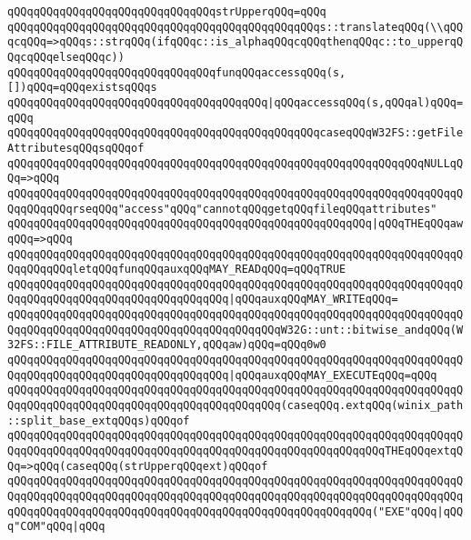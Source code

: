 \verb|qQQqqQQqqQQqqQQqqQQqqQQqqQQqqQQqstrUpperqQQq=qQQq|\newline
\verb|qQQqqQQqqQQqqQQqqQQqqQQqqQQqqQQqqQQqqQQqqQQqqQQqs::translateqQQq(\\qQQqcqQQq=>qQQqs::strqQQq(ifqQQqc::is_alphaqQQqcqQQqthenqQQqc::to_upperqQQqcqQQqelseqQQqc))|\newline
\newline
\verb|qQQqqQQqqQQqqQQqqQQqqQQqqQQqqQQqfunqQQqaccessqQQq(s,[])qQQq=qQQqexistsqQQqs|\newline
\verb|qQQqqQQqqQQqqQQqqQQqqQQqqQQqqQQqqQQqqQQq|\verb#|qQQqaccessqQQq(s,qQQqal)qQQq=qQQq#\newline
\verb|qQQqqQQqqQQqqQQqqQQqqQQqqQQqqQQqqQQqqQQqqQQqqQQqcaseqQQqW32FS::getFileAttributesqQQqsqQQqof|\newline
\verb|qQQqqQQqqQQqqQQqqQQqqQQqqQQqqQQqqQQqqQQqqQQqqQQqqQQqqQQqqQQqqQQqNULLqQQq=>qQQq|\newline
\verb|qQQqqQQqqQQqqQQqqQQqqQQqqQQqqQQqqQQqqQQqqQQqqQQqqQQqqQQqqQQqqQQqqQQqqQQqqQQqqQQqrseqQQq"access"qQQq"cannotqQQqgetqQQqfileqQQqattributes"|\newline
\verb|qQQqqQQqqQQqqQQqqQQqqQQqqQQqqQQqqQQqqQQqqQQqqQQqqQQqqQQq|\verb#|qQQqTHEqQQqawqQQq=>qQQq#\newline
\verb|qQQqqQQqqQQqqQQqqQQqqQQqqQQqqQQqqQQqqQQqqQQqqQQqqQQqqQQqqQQqqQQqqQQqqQQqqQQqqQQqletqQQqfunqQQqauxqQQqMAY_READqQQq=qQQqTRUE|\newline
\verb|qQQqqQQqqQQqqQQqqQQqqQQqqQQqqQQqqQQqqQQqqQQqqQQqqQQqqQQqqQQqqQQqqQQqqQQqqQQqqQQqqQQqqQQqqQQqqQQqqQQqqQQq|\verb#|qQQqauxqQQqMAY_WRITEqQQq=#\newline
\verb|qQQqqQQqqQQqqQQqqQQqqQQqqQQqqQQqqQQqqQQqqQQqqQQqqQQqqQQqqQQqqQQqqQQqqQQqqQQqqQQqqQQqqQQqqQQqqQQqqQQqqQQqqQQqqQQqW32G::unt::bitwise_andqQQq(W32FS::FILE_ATTRIBUTE_READONLY,qQQqaw)qQQq=qQQq0w0|\newline
\verb|qQQqqQQqqQQqqQQqqQQqqQQqqQQqqQQqqQQqqQQqqQQqqQQqqQQqqQQqqQQqqQQqqQQqqQQqqQQqqQQqqQQqqQQqqQQqqQQqqQQqqQQq|\verb#|qQQqauxqQQqMAY_EXECUTEqQQq=qQQq#\newline
\verb|qQQqqQQqqQQqqQQqqQQqqQQqqQQqqQQqqQQqqQQqqQQqqQQqqQQqqQQqqQQqqQQqqQQqqQQqqQQqqQQqqQQqqQQqqQQqqQQqqQQqqQQqqQQqqQQq(caseqQQq.extqQQq(winix_path::split_base_extqQQqs)qQQqof|\newline
\verb|qQQqqQQqqQQqqQQqqQQqqQQqqQQqqQQqqQQqqQQqqQQqqQQqqQQqqQQqqQQqqQQqqQQqqQQqqQQqqQQqqQQqqQQqqQQqqQQqqQQqqQQqqQQqqQQqqQQqqQQqqQQqqQQqTHEqQQqextqQQq=>qQQq(caseqQQq(strUpperqQQqext)qQQqof|\newline
\verb|qQQqqQQqqQQqqQQqqQQqqQQqqQQqqQQqqQQqqQQqqQQqqQQqqQQqqQQqqQQqqQQqqQQqqQQqqQQqqQQqqQQqqQQqqQQqqQQqqQQqqQQqqQQqqQQqqQQqqQQqqQQqqQQqqQQqqQQqqQQqqQQqqQQqqQQqqQQqqQQqqQQqqQQqqQQqqQQqqQQqqQQqqQQqqQQqqQQq("EXE"qQQq|\verb#|qQQq"COM"qQQq|qQQq#\newline

